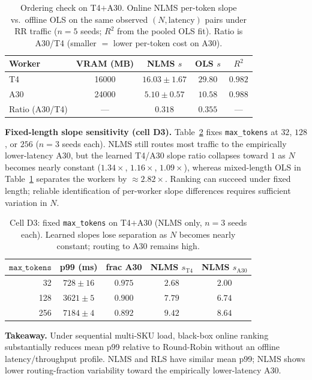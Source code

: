 \documentclass[pdflatex,sn-mathphys-num]{sn-jnl}
\begin{document}
\begin{table}[!t]
\centering
\caption{Ordering check on T4$+$A30. Online NLMS per-token slope
vs.\ offline OLS on the same observed $(N,\text{latency})$ pairs under RR traffic
($n{=}5$ seeds; $R^{2}$ from the pooled OLS fit). Ratio is A30/T4 (smaller $=$ lower
per-token cost on A30).}
\label{tab:slopeD}
\footnotesize
\setlength{\tabcolsep}{3.5pt}
\begin{tabular}{@{}lcccc@{}}
\toprule
Worker & VRAM (MB) & NLMS $s$ & OLS $s$ & $R^{2}$ \\
\midrule
T4 & 16000 & $16.03\pm1.67$ & $29.80$ & $0.982$ \\
A30 & 24000 & $5.10\pm0.57$ & $10.58$ & $0.988$ \\
\midrule
Ratio (A30/T4) & --- & $0.318$ & $0.355$ & --- \\
\bottomrule
\end{tabular}
\end{table}

\textbf{Fixed-length slope sensitivity (cell D3).}
Table~\ref{tab:d3} fixes \texttt{max\_tokens} at $32$, $128$, or $256$
($n{=}3$ seeds each). NLMS still routes most traffic to the empirically
lower-latency A30, but the learned T4/A30 slope ratio collapses toward $1$ as $N$
becomes nearly constant ($1.34\times$, $1.16\times$, $1.09\times$), whereas
mixed-length OLS in Table~\ref{tab:slopeD} separates the workers by
$\approx 2.82\times$. Ranking can succeed under fixed length; reliable
identification of per-worker slope differences requires sufficient variation in
$N$.

\begin{table}[!t]
\centering
\caption{Cell D3: fixed \texttt{max\_tokens} on T4$+$A30 (NLMS only, $n{=}3$ seeds
each). Learned slopes lose separation as $N$ becomes nearly constant; routing to
A30 remains high.}
\label{tab:d3}
\footnotesize
\setlength{\tabcolsep}{3.5pt}
\begin{tabular}{@{}rcccc@{}}
\toprule
$\texttt{max\_tokens}$ & p99 (ms) & frac A30 & NLMS $s_{\mathrm{T4}}$ & NLMS $s_{\mathrm{A30}}$ \\
\midrule
32 & $728\pm16$ & $0.975$ & $2.68$ & $2.00$ \\
128 & $3621\pm5$ & $0.900$ & $7.79$ & $6.74$ \\
256 & $7184\pm4$ & $0.892$ & $9.42$ & $8.64$ \\
\bottomrule
\end{tabular}
\end{table}

\textbf{Takeaway.} Under sequential multi-SKU load, black-box online ranking
substantially reduces mean p99 relative to Round-Robin without an offline
latency/throughput profile. NLMS and RLS have similar mean p99; NLMS shows lower
routing-fraction variability toward the empirically lower-latency A30.
\end{document}

